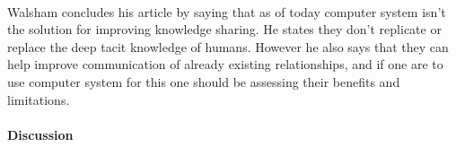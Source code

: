 \documentclass{article}
\begin{document}
\paragraph{} Walsham concludes his article by saying that as of today computer system isn't the solution for improving knowledge sharing. He states they don't replicate or replace the deep tacit knowledge of humans. However he also says that they can help improve communication of already existing relationships, and if one are to use computer system for this one should be assessing their benefits and limitations. 

\paragraph{Discussion}



\end{document}
